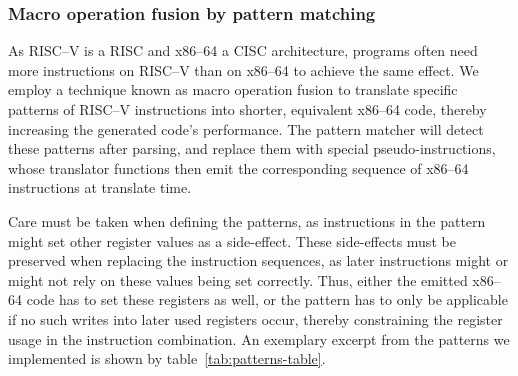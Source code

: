 \subsubsection{Macro operation fusion by pattern matching}
\label{sec:pattern-matching}
As RISC--V is a RISC and x86--64 a CISC architecture, programs often need more instructions on RISC--V than on x86--64 to achieve the same effect.
We employ a technique known as macro operation fusion to translate specific patterns of RISC--V instructions into shorter, equivalent x86--64 code, thereby increasing the generated code's performance.
The pattern matcher will detect these patterns after parsing, and replace them with special pseudo-instructions, whose translator functions then emit the corresponding sequence of x86--64 instructions at translate time.

Care must be taken when defining the patterns, as instructions in the pattern might set other register values as a side-effect.
These side-effects must be preserved when replacing the instruction sequences, as later instructions might or might not rely on these values being set correctly.
Thus, either the emitted x86--64 code has to set these registers as well, or the pattern has to only be applicable if no such writes into later used registers occur, thereby constraining the register usage in the instruction combination.
An exemplary excerpt from the patterns we implemented is shown by table~\ref{tab:patterns-table}.

\begin{table}[t]
	\centering
	\ttfamily
	\small
	\caption[Patterns used for macro-op-fusion]%
	{Some examples of patterns currently fused by the translator, the last five taken from the RISC--V emulator project rv8~\cite{clark2017rv8}.}
	\label{tab:patterns-table}
\end{table}















